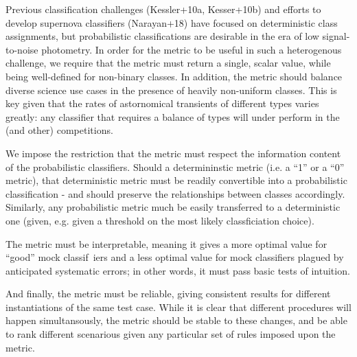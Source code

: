 Previous classification challenges (Kessler+10a, Kesser+10b) and efforts to develop supernova classifiers (Narayan+18) have focused on deterministic class assignments, but probabilistic classifications are desirable in the era of low signal-to-noise photometry. In order for the metric to be useful in such a heterogenous challenge, we require that the metric must return a single, scalar value, while being well-defined for non-binary classes.
In addition, the metric should balance diverse science use cases in the presence of heavily non-uniform classes. This is key given that the rates of astornomical transients of different types varies greatly: any classifier that requires a balance of types will under perform in the \plasticc (and other) competitions.

We impose the restriction that the metric must respect the information content of the probabilistic classifiers. Should a determininstic metric (i.e. a ``1'' or a ``0'' metric), that deterministic metric must be readily convertible into a probabilistic classification - and should preserve the relationships between classes accordingly. Similarly, any probabilistic metric much be easily transferred to a deterministic one (given, e.g. given a threshold on the most likely classficiation choice).

The metric must be interpretable, meaning it gives a more optimal value for ``good'' mock classif\
iers and a less optimal value for mock classifiers plagued by anticipated systematic errors; in other words, it must pass basic tests of intuition.

And finally, the metric must be reliable, giving consistent results for different instantiations of the same test case. While it is clear that different procedures will happen simultansously, the metric should be stable to these changes, and be able to rank different scenarious given any particular set of rules imposed upon the metric.



